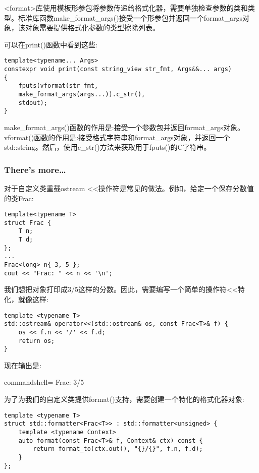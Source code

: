 <format>库使用模板形参包将参数传递给格式化器，需要单独检查参数的类和类型。标准库函数make\_format\_args()接受一个形参包并返回一个format\_args对象，该对象需要提供格式化参数的类型擦除列表。

可以在print()函数中看到这些:

\begin{lstlisting}[style=styleCXX]
template<typename... Args>
constexpr void print(const string_view str_fmt, Args&&... args)
{
	fputs(vformat(str_fmt,
	make_format_args(args...)).c_str(),
	stdout);
}
\end{lstlisting}

make\_format\_args()函数的作用是:接受一个参数包并返回format\_args对象。vformat()函数的作用是:接受格式字符串和format\_args对象，并返回一个std::string。然后，使用c\_str()方法来获取用于fputs()的C字符串。

\subsubsection{There's more…}

对于自定义类重载ostream <{}<操作符是常见的做法。例如，给定一个保存分数值的类Frac:

\begin{lstlisting}[style=styleCXX]
template<typename T>
struct Frac {
	T n;
	T d;
};
...
Frac<long> n{ 3, 5 };
cout << "Frac: " << n << '\n';
\end{lstlisting}

我们想把对象打印成3/5这样的分数。因此，需要编写一个简单的操作符<{}<特化，就像这样:

\begin{lstlisting}[style=styleCXX]
template <typename T>
std::ostream& operator<<(std::ostream& os, const Frac<T>& f) {
	os << f.n << '/' << f.d;
	return os;
}
\end{lstlisting}

现在输出是:

\begin{tcblisting}{commandshell={}}
Frac: 3/5
\end{tcblisting}

为了为我们的自定义类提供format()支持，需要创建一个特化的格式化器对象:

\begin{lstlisting}[style=styleCXX]
template <typename T>
struct std::formatter<Frac<T>> : std::formatter<unsigned> {
	template <typename Context>
	auto format(const Frac<T>& f, Context& ctx) const {
		return format_to(ctx.out(), "{}/{}", f.n, f.d);
	}
};
\end{lstlisting}

